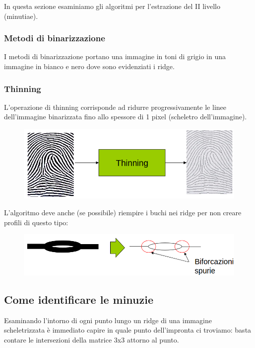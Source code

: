 In questa sezione esaminiamo gli algoritmi per l'estrazione del II livello (minutiae).

\subsubsection{Metodi di binarizzazione}

I metodi di binarizzazione portano una immagine in toni di
grigio in una immagine in bianco e nero dove sono
evidenziati i ridge.

\subsubsection{Thinning}

L’operazione di thinning corrisponde ad ridurre
progressivamente le linee dell’immagine
binarizzata fino allo spessore di 1 pixel (scheletro
dell’immagine).

\begin{figure}[ht]
    \centering
    \includegraphics[width=0.75\linewidth]{chapters/images-chap6/thinning.png}
\end{figure}

\newpage
L’algoritmo deve anche (se possibile) riempire i
buchi nei ridge per non creare profili di questo
tipo:
\begin{figure}[ht]
    \centering
    \includegraphics[width=1\linewidth]{chapters/images-chap6/thinning-bif.png}
\end{figure}


\subsection{Come identificare le minuzie}

Esaminando l’intorno di ogni punto lungo un ridge
di una immagine scheletrizzata è immediato capire in 
quale punto dell'impronta ci troviamo: basta contare le intersezioni
della matrice 3x3 attorno al punto.

